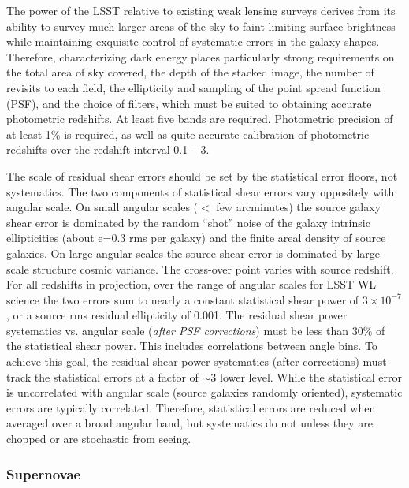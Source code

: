 The power of the LSST relative to existing weak lensing surveys derives from its
ability to survey much larger areas of the sky to faint limiting
surface brightness while maintaining exquisite control of systematic errors in the
galaxy shapes. Therefore, characterizing dark energy places particularly strong
requirements on the total area of sky covered, the depth of the stacked image, the
number of revisits to each field, the ellipticity and sampling of the point spread
function (PSF), and the choice of filters, which must be suited to obtaining accurate
photometric redshifts. At least five bands are required. Photometric precision of at
least 1\% is required, as well as quite accurate calibration of photometric redshifts over the
redshift interval 0.1 -- 3.

The scale of residual shear errors should be set by the statistical error floors,
not systematics. The two components of statistical shear errors vary oppositely
with angular scale. On small angular scales ($<$ few arcminutes) the source galaxy
shear error is dominated by the random ``shot'' noise of the galaxy intrinsic
ellipticities (about e=0.3 rms per galaxy) and the finite areal density of source
galaxies. On large angular scales the source shear error is dominated by large scale
structure cosmic variance. The cross-over point varies with source redshift. For
all redshifts in projection, over the range of angular scales for LSST WL science
the two errors sum to nearly a constant statistical shear power of $3\times 10^{-7}$,
or a source rms residual ellipticity of 0.001. The residual shear power
systematics vs. angular scale ({\it after PSF corrections}) must be less than 30\% of
the statistical shear power. This includes correlations between angle bins. To achieve
this goal, the residual shear power systematics (after corrections) must track the
statistical errors at a factor of $\sim$3 lower level. While the statistical error is
uncorrelated with angular scale (source galaxies randomly oriented), systematic
errors are typically correlated. Therefore, statistical errors are reduced when
averaged over a broad angular band, but systematics do not unless they are chopped
or are stochastic from seeing.




\subsubsection{Supernovae}

